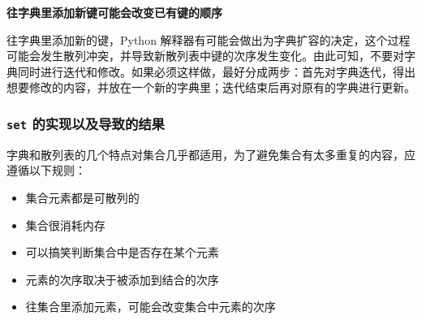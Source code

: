 \noindent\textbf{往字典里添加新键可能会改变已有键的顺序}

往字典里添加新的键，Python 解释器有可能会做出为字典扩容的决定，这个过程可能会发生散列冲突，并导致新散列表中键的次序发生变化。由此可知，不要对字典同时进行迭代和修改。如果必须这样做，最好分成两步：首先对字典迭代，得出想要修改的内容，并放在一个新的字典里；迭代结束后再对原有的字典进行更新。

\subsubsection{\texttt{set} 的实现以及导致的结果}
字典和散列表的几个特点对集合几乎都适用，为了避免集合有太多重复的内容，应遵循以下规则：
\begin{itemize}
    \item 集合元素都是可散列的
    \item 集合很消耗内存
    \item 可以搞笑判断集合中是否存在某个元素
    \item 元素的次序取决于被添加到结合的次序
    \item 往集合里添加元素，可能会改变集合中元素的次序
\end{itemize}


\newpage